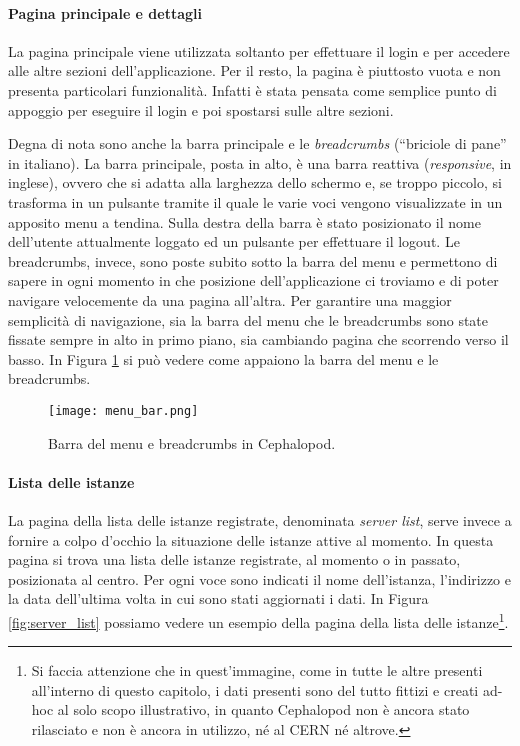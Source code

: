             \paragraph{Pagina principale e dettagli}La pagina principale viene utilizzata soltanto per effettuare il login e per accedere alle altre sezioni dell'applicazione. Per il resto, la pagina è piuttosto vuota e non presenta particolari funzionalità. Infatti è stata pensata come semplice punto di appoggio per eseguire il login e poi spostarsi sulle altre sezioni.
            
            Degna di nota sono anche la barra principale e le \textit{breadcrumbs} (``briciole di pane'' in italiano). La barra principale, posta in alto, è una barra reattiva (\textit{responsive}, in inglese), ovvero che si adatta alla larghezza dello schermo e, se troppo piccolo, si trasforma in un pulsante tramite il quale le varie voci vengono visualizzate in un apposito menu a tendina. Sulla destra della barra è stato posizionato il nome dell'utente attualmente loggato ed un pulsante per effettuare il logout. Le breadcrumbs, invece, sono poste subito sotto la barra del menu e permettono di sapere in ogni momento in che posizione dell'applicazione ci troviamo e di poter navigare velocemente da una pagina all'altra. Per garantire una maggior semplicità di navigazione, sia la barra del menu che le breadcrumbs sono state fissate sempre in alto in primo piano, sia cambiando pagina che scorrendo verso il basso. In Figura \ref{fig:menu_bar} si può vedere come appaiono la barra del menu e le breadcrumbs.
            
        	\begin{figure}[h!]
        		\begin{center}
        			\texttt{[image: menu\_bar.png]}
        		\end{center}
        		\caption[Barra del menu e breadcrumbs]{Barra del menu e breadcrumbs in Cephalopod.}
        		\label{fig:menu_bar}
        	\end{figure}
            
            \paragraph{Lista delle istanze}La pagina della lista delle istanze registrate, denominata \textit{server list}, serve invece a fornire a colpo d'occhio la situazione delle istanze attive al momento. In questa pagina si trova una lista delle istanze registrate, al momento o in passato, posizionata al centro. Per ogni voce sono indicati il nome dell'istanza, l'indirizzo e la data dell'ultima volta in cui sono stati aggiornati i dati. In Figura \ref{fig:server_list} possiamo vedere un esempio della pagina della lista delle istanze\footnote{Si faccia attenzione che in quest'immagine, come in tutte le altre presenti all'interno di questo capitolo, i dati presenti sono del tutto fittizi e creati ad-hoc al solo scopo illustrativo, in quanto Cephalopod non è ancora stato rilasciato e non è ancora in utilizzo, né al \ac{CERN} né altrove.}.
            
